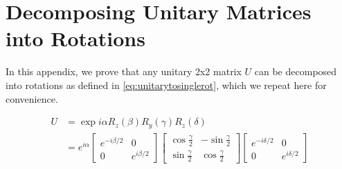 \chapter{Decomposing Unitary Matrices into Rotations\label{ch:proofunitarytorot}}

In this appendix, we prove that any unitary 2x2 matrix $U$ can be decomposed into rotations as defined in \eqref{eq:unitarytosinglerot}, which we repeat here for convenience.

\begin{align}
\label{eq:toprove}
U &= \exp{i\alpha}R_z(\beta)R_y(\gamma)R_z(\delta)\\ 
&= e^{i\alpha}\left[\begin{array}{cc}e^{-i\beta/2} & 0\\
0 & e^{i\beta/2}\end{array}\right]
\left[\begin{array}{cc}\cos\frac{\gamma}{2} & -\sin\frac{\gamma}{2}\\
\sin\frac{\gamma}{2} & \cos\frac{\gamma}{2}\end{array}\right] 
\left[\begin{array}{cc}e^{-i\delta/2} & 0\\
0 & e^{i\delta/2}\end{array}\right]
\end{align}

